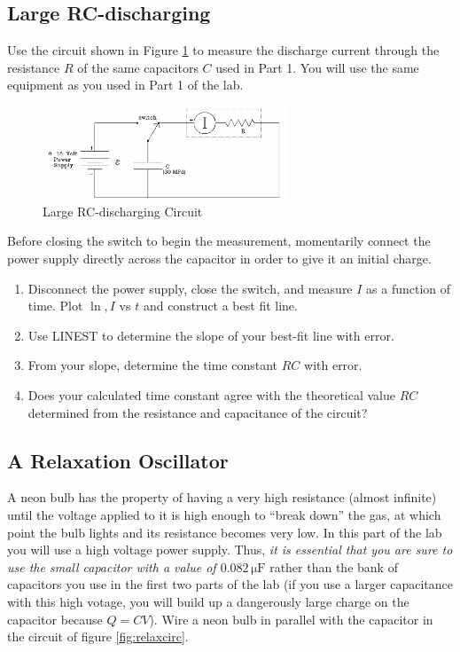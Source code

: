\subsection{Large RC-discharging}

Use the circuit shown in Figure \ref{fig:largercdischarge} to measure the discharge current through the resistance $R$ of the same capacitors $C$ used in Part 1. You will use the same equipment as you used in Part 1 of the lab. \myskip

\begin{figure}[h]
   \begin{center}
       \includegraphics[width=0.65\textwidth]{./Exp3/pic/image7.png}
   \end{center}
   \caption{Large RC-discharging Circuit}
   \label{fig:largercdischarge}
\end{figure}

Before closing the switch to begin the measurement, momentarily connect the power supply directly across the capacitor in order to give it an initial charge.
\begin{enumerate}
  \item Disconnect the power supply, close the switch, and measure $I$ as a function of time. Plot $\ln,I$ vs $t$ and construct a best fit line.
  \item Use LINEST to determine the slope of your best-fit line with error.
  \item From your slope, determine the time constant $RC$ with error.
  \item Does your calculated time constant agree with the theoretical value $RC$ determined from the resistance and capacitance of the circuit?
\end{enumerate}

\subsection{A Relaxation Oscillator}

A neon bulb has the property of having a very high resistance (almost infinite) until the voltage applied to it is high enough to ``break down'' the gas, at which point the bulb lights and its resistance becomes very low. In this part of the lab you will use a high voltage power supply. Thus, \emph{it is essential that you are sure to use the small capacitor with a value of $0.082\,\mathrm{\mu F}$} rather than the bank of capacitors you use in the first two parts of the lab (if you use a larger capacitance with this high votage, you will build up a dangerously large charge on the capacitor because $Q=CV$). Wire a neon bulb in parallel with the capacitor in the circuit of figure \ref{fig:relaxcirc}.\myskip


